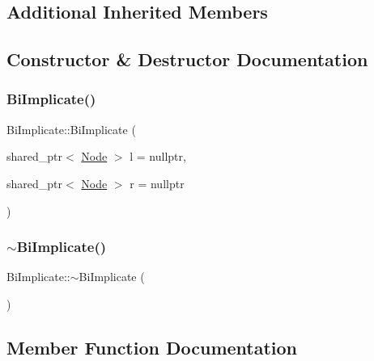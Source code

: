 \subsection*{Additional Inherited Members}


\subsection{Constructor \& Destructor Documentation}
\mbox{\label{class_bi_implicate_acd402fb9b2eef1b44361448038f20ddc}} 
\subsubsection{\texorpdfstring{Bi\+Implicate()}{BiImplicate()}}
{\footnotesize\ttfamily Bi\+Implicate\+::\+Bi\+Implicate (\begin{DoxyParamCaption}\item[{shared\+\_\+ptr$<$ \hyperlink{class_node}{Node} $>$}]{l = {\ttfamily nullptr},  }\item[{shared\+\_\+ptr$<$ \hyperlink{class_node}{Node} $>$}]{r = {\ttfamily nullptr} }\end{DoxyParamCaption})\hspace{0.3cm}{\ttfamily [explicit]}}

\mbox{\label{class_bi_implicate_ad3f12180788d7d207b2e385c2a89c35b}} 
\subsubsection{\texorpdfstring{$\sim$\+Bi\+Implicate()}{~BiImplicate()}}
{\footnotesize\ttfamily Bi\+Implicate\+::$\sim$\+Bi\+Implicate (\begin{DoxyParamCaption}{ }\end{DoxyParamCaption})\hspace{0.3cm}{\ttfamily [override]}}



\subsection{Member Function Documentation}
\mbox{\label{class_bi_implicate_a3f79e7340ff831b0bb927d8a70414ac3}} 
